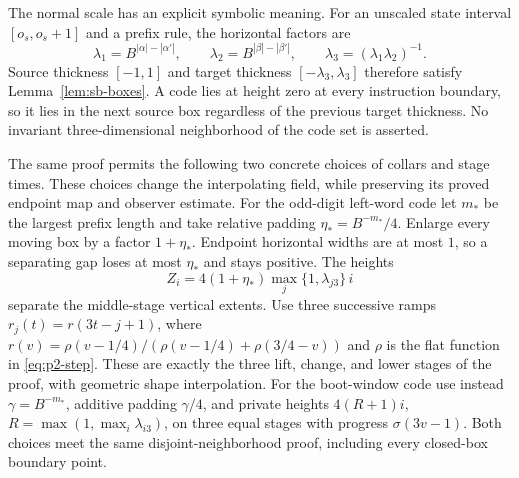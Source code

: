 The normal scale has an explicit symbolic meaning. For an unscaled state interval $[o_s,o_s+1]$ and a prefix rule, the horizontal factors are
\[
 \lambda_1=B^{|\alpha|-|\alpha'|},\qquad
 \lambda_2=B^{|\beta|-|\beta'|},\qquad
 \lambda_3=(\lambda_1\lambda_2)^{-1}.
\]
Source thickness $[-1,1]$ and target thickness $[-\lambda_3,\lambda_3]$ therefore satisfy Lemma~\ref{lem:sb-boxes}.  A code lies at height zero at every instruction boundary, so it lies in the next source box regardless of the previous target thickness.  No invariant three-dimensional neighborhood of the code set is asserted.

The same proof permits the following two concrete choices of collars
and stage times. These choices change the interpolating field, while
preserving its proved endpoint map and observer estimate.  For the odd-digit left-word code let $m_*$ be the largest prefix length and take relative padding $\eta_*=B^{-m_*}/4$.  Enlarge every moving box by a factor $1+\eta_*$.  Endpoint horizontal widths are at most $1$, so a separating gap loses at most $\eta_*$ and stays positive.  The heights
\[
 Z_i=4(1+\eta_*)\max_j\{1,\lambda_{j3}\}\,i
\]
separate the middle-stage vertical extents.  Use three successive ramps $r_j(t)=r(3t-j+1)$, where
$r(v)=\rho(v-1/4)/(\rho(v-1/4)+\rho(3/4-v))$ and $\rho$ is the flat function in \eqref{eq:p2-step}.  These are exactly the three lift, change, and lower stages of the proof, with geometric shape interpolation.  For the boot-window code use instead $\gamma=B^{-m_*}$, additive padding $\gamma/4$, and private heights $4(R+1)i$, $R=\max(1,\max_i\lambda_{i3})$, on three equal stages with progress $\sigma(3v-1)$.  Both choices meet the same disjoint-neighborhood proof, including every closed-box boundary point.

